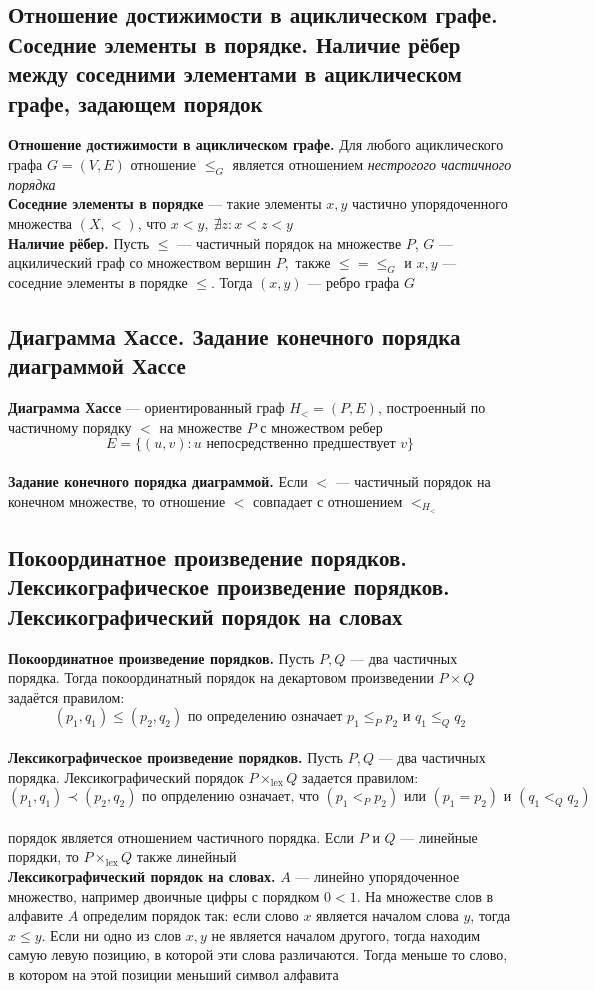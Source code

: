 \documentclass[a4paper]{article}
\begin{document}
\subsection{Отношение достижимости в ациклическом графе. Соседние элементы в порядке. Наличие рёбер между соседними элементами в ациклическом графе, задающем порядок}
\textbf{Отношение достижимости в ациклическом графе.} Для любого ациклического графа $G=(V,E)$ отношение $\leqslant_G$ является отношением \textit{нестрогого частичного порядка}\\[2mm]
\indent\textbf{Соседние элементы в порядке} — такие элементы $x,y$ частично упорядоченного множества $(X,<)$, что $x<y,\ \nexists z:x<z<y$\\[2mm]
\indent\textbf{Наличие рёбер.} Пусть $\leqslant$ — частичный порядок на множестве $P$, $G$ — ацкилический граф со множеством вершин $P,$ также $\leqslant=\leqslant_G$ и $x,y$ — соседние элементы в порядке $\leqslant$. Тогда $(x,y)$ — ребро графа $G$

\subsection{Диаграмма Хассе. Задание конечного порядка диаграммой Хассе}
\textbf{Диаграмма Хассе} — ориентированный граф $H_<=(P,E)$, построенный по частичному порядку $<$ на множестве $P$ с множеством ребер $$E=\{(u,v):u\textrm{ непосредственно предшествует } v\}$$\\
\indent\textbf{Задание конечного порядка диаграммой.} Если $<$ — частичный порядок на конечном множестве, то отношение $<$ совпадает с отношением $<_{H_<}$

\subsection{Покоординатное произведение порядков. Лексикографическое произведение порядков. Лексикографический порядок на словах}
\textbf{Покоординатное произведение порядков.} Пусть $P,Q$ — два частичных порядка. Тогда покоординатный порядок на декартовом произведении $P\times Q$ задаётся правилом: $$(p_1,q_1)\leqslant(p_2,q_2)\textrm{ по определению означает }p_1\leqslant_P p_2\textrm{ и }q_1\leqslant_Q q_2$$\\
\indent\textbf{Лексикографическое произведение порядков.} Пусть $P,Q$ — два частичных порядка. Лексикографический порядок $P\times_{\textrm{lex}}Q$ задается правилом:$$(p_1, q_1)\prec(p_2,q_2)\textrm{ по опрделению означает, что }(p_1<_P p_2)\textrm{ или }(p_1=p_2)\textrm{ и }(q_1<_Q q_2)$$ \\
 порядок является отношением частичного порядка. Если $P$ и $Q$ — линейные порядки, то $P\times_{\textrm{lex}}Q$ также линейный\\[2mm]
\indent\textbf{Лексикографический порядок на словах.} $A$ — линейно упорядоченное множество, например двоичные цифры с порядком $0<1$. На множестве слов в алфавите $A$ определим порядок так: если слово $x$ является началом слова $y$, тогда $x\leqslant y$. Если ни одно из слов $x,y$ не является началом другого, тогда находим самую левую позицию, в которой эти слова различаются. Тогда меньше то слово, в котором на этой позиции меньший символ алфавита
\end{document}
